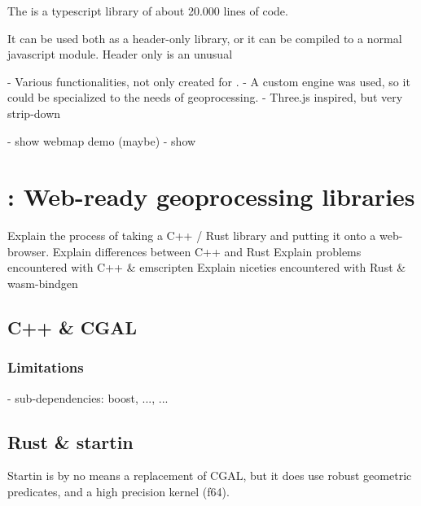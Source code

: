 The  is a typescript library of about 20.000 lines of code. 

It can be used both as a header-only library, or it can be compiled to a normal javascript module. 
Header only is an unusual 

- Various functionalities, not only created for \geofront{}.
- A custom engine was used, so it could be specialized to the needs of geoprocessing. 
- Three.js inspired, but very strip-down

- show webmap demo (maybe)
- show 


\newpage

\section{\mySubRQTwoTitle: Web-ready geoprocessing libraries}
\label{sec:implementation:compilation}

\begin{note}
Explain the process of taking a C++ / Rust library and putting it onto a web-browser.
Explain differences between C++ and Rust 
Explain problems encountered with C++ & emscripten
Explain niceties encountered with Rust & wasm-bindgen
\end{note}


\subsection{C++ \& CGAL}

\subsubsection{Limitations}

\begin{note}
- sub-dependencies: boost, ..., ...
\end{note}
  
\subsection{Rust \& startin}

\begin{note}
Startin is by no means a replacement of CGAL, 
but it does use robust geometric predicates, and a high precision kernel (f64).
\end{note}

